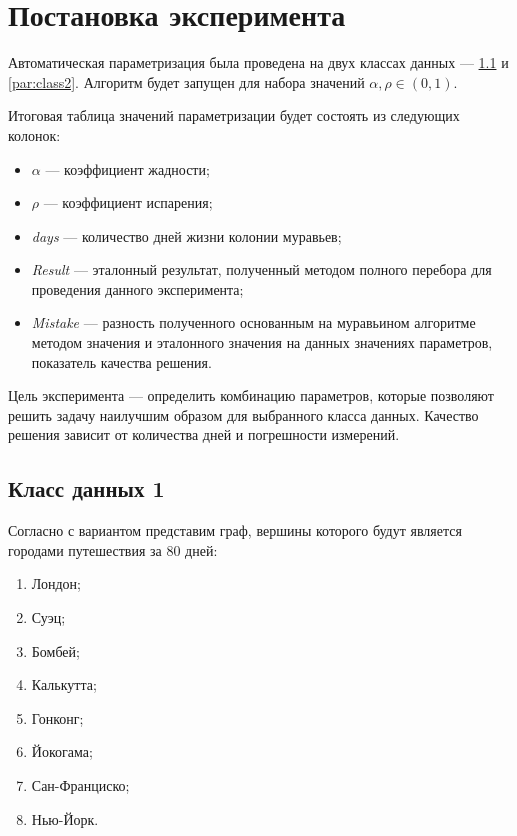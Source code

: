 \clearpage

\section{Постановка эксперимента}

Автоматическая параметризация была проведена на двух классах данных --- \ref{par:class1} и \ref{par:class2}. Алгоритм будет запущен для набора значений $\alpha, \rho \in (0, 1)$.

Итоговая таблица значений параметризации будет состоять из следующих колонок:
\begin{itemize}[label=---]
	\item $\alpha$ --- коэффициент жадности;
	\item $\rho$ --- коэффициент испарения;
	\item \textit{days} --- количество дней жизни колонии муравьев;
	\item \textit{Result} --- эталонный результат, полученный методом полного перебора для проведения данного эксперимента;
	\item \textit{Mistake} --- разность полученного основанным на муравьином алгоритме методом значения и эталонного значения на данных значениях параметров, показатель качества решения.
\end{itemize}

Цель эксперимента --- определить комбинацию параметров, которые позволяют решить задачу наилучшим образом для выбранного класса данных. Качество решения зависит от количества дней и погрешности измерений.

\subsection{Класс данных 1}\label{par:class1}

Согласно с вариантом представим граф, вершины которого будут является городами путешествия за 80 дней:
\begin{enumerate}
	\item Лондон;
	\item Суэц;
	\item Бомбей;
	\item Калькутта;
	\item Гонконг;
	\item Йокогама;
	\item Сан-Франциско;
	\item Нью-Йорк.
\end{enumerate}

